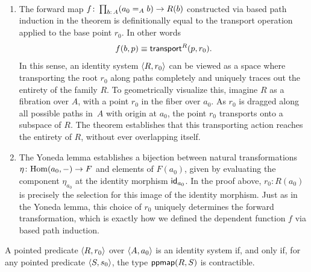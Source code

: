 \begin{rems}\label{rem:f-is-transport}\ 
    \begin{enumerate}[-]
        \item The forward map $f\colon\prod_{b\colon A}(a_0\eq Ab)\to R(b)$ constructed via based path induction in the theorem is definitionally equal to the transport operation applied to the base point $r_0$. In other words
        \[
            f(b,p)\equiv\mathsf{transport}^R(p,r_0).
        \]
        In this sense, an identity system $\langle R,r_0\rangle$ can be viewed as a space where transporting the root $r_0$ along paths completely and uniquely traces out the entirety of the family $R$. To geometrically visualize this, imagine $R$ as a fibration over $A$, with a point $r_0$ in the fiber over $a_0$. As $r_0$ is dragged along all possible paths in~$A$ with origin at $a_0$, the point $r_0$ transports onto a subspace of $R$. The theorem establishes that this transporting action reaches the entirety of $R$, without ever overlapping itself.

        \item The Yoneda lemma establishes a bijection between natural transformations $\eta\colon\Hom(a_0,\dummy)\to F$ and elements of $F(a_0)$, given by evaluating the component $\eta_{a_0}$ at the identity morphism $\mathsf{id}_{a_0}$. In the proof above, $r_0\colon R(a_0)$ is precisely the selection for this image of the identity morphism. Just as in the Yoneda lemma, this choice of $r_0$ uniquely determines the forward transformation, which is exactly how we defined the dependent function $f$ via based path induction.
    \end{enumerate}
\end{rems}

\begin{thm}\label{thm:ppmap-contractibility}
    A pointed predicate\/ $\langle R,r_0\rangle$ over\/ $\langle A,a_0\rangle$ is an identity system if, and only if, for any pointed predicate\/ $\langle S,s_0\rangle$, the type\/ $\mathsf{ppmap}(R,S)$ is contractible.
\end{thm}

